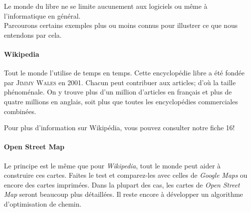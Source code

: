 \documentclass[10pt]{../fiche}
\begin{document}

Le monde du libre ne se limite aucunement aux logiciels ou même à l'informatique en général.\\
Parcourons certains exemples plus ou moins connus pour illustrer ce que nous entendons par cela.

\paragraph{Wikipedia}
Tout le monde l'utilise de temps en temps. Cette encyclopédie libre a été fondée par \textsc{Jimmy Wales} en 2001.
Chacun peut contribuer aux articles; d'où la taille phénoménale.
On y trouve plus d'un million d'articles en français et plus de quatre millions en anglais, soit plus que toutes les encyclopédies commerciales combinées.

Pour plus d'information sur Wikipédia, vous pouvez consulter notre fiche 16!

\paragraph{Open Street Map}
Le principe est le même que pour \textit{Wikipedia}, tout le monde peut aider à construire ces cartes.
Faites le test et comparez-les avec celles de \textit{Google Maps} ou encore des cartes imprimées.
Dans la plupart des cas, les cartes de \textit{Open Street Map} seront beaucoup plus détaillées.
Il reste encore à développer un algorithme d'optimisation de chemin.
\end{document}
